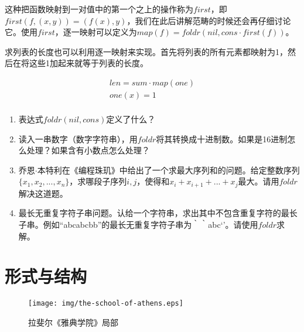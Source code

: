 \documentclass[UTF8]{article}
\begin{document}
这种把函数映射到一对值中的第一个之上的操作称为$first$，即$first(f, (x, y)) = (f(x), y)$，我们在此后讲解范畴的时候还会再仔细讨论它。使用$first$，逐一映射可以定义为$map(f) = foldr(nil, cons \cdot first(f))$。

求列表的长度也可以利用逐一映射来实现。首先将列表的所有元素都映射为1，然后在将这些1加起来就等于列表的长度。

\[
\begin{array}{l}
len = sum \cdot map(one) \\
one(x) = 1 \\
\end{array}
\]

\begin{Exercise}
\begin{enumerate}
\item 表达式$foldr(nil, cons)$定义了什么？
\item 读入一串数字（数字字符串），用$foldr$将其转换成十进制数。如果是16进制怎么处理？如果含有小数点怎么处理？
\item 乔恩$\cdot$本特利在《编程珠玑》中给出了一个求最大序列和的问题。给定整数序列$\{x_1, x_2, ..., x_n\}$，求哪段子序列$i, j$，使得和$x_i + x_{i+1} + ... + x_j$最大。请用$foldr$解决这道题。
\item 最长无重复字符子串问题。认给一个字符串，求出其中不包含重复字符的最长子串。例如``abcabcbb''的最长无重复字符子串为｀｀abc‘’。请使用$foldr$求解。
\end{enumerate}
\end{Exercise}

\section{形式与结构}

\begin{figure}[htbp]
 \centering
 \texttt{[image: img/the-school-of-athens.eps]}
 \caption{拉斐尔《雅典学院》局部}
 \label{fig:the-school-of-athens}
\end{figure}
\end{document}
